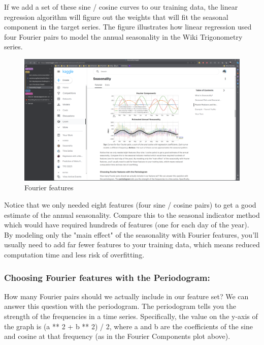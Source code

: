 \documentclass[12pt]{report}
\begin{document}
If we add a set of these sine / cosine curves to our training data, the linear regression algorithm will figure out the weights that will fit the seasonal component in the target series. The figure illustrates how linear regression used four Fourier pairs to model the annual seasonality in the Wiki Trigonometry series.

\begin{figure}[htbp]
  \begin{center}
    \includegraphics[trim =30cm 10.0cm 20cm 11cm, clip, scale=0.4]{pics/curves.png}
    \caption{Fourier features}
  \end{center}
\end{figure}

Notice that we only needed eight features (four sine / cosine pairs) to get a good estimate of the annual seasonality. Compare this to the seasonal indicator method which would have required hundreds of features (one for each day of the year). By modeling only the "main effect" of the seasonality with Fourier features, you'll usually need to add far fewer features to your training data, which means reduced computation time and less risk of overfitting.

\subsubsection{Choosing Fourier features with the Periodogram:}

How many Fourier pairs should we actually include in our feature set? We can answer this question with the periodogram. The periodogram tells you the strength of the frequencies in a time series. Specifically, the value on the y-axis of the graph is (a ** 2 + b ** 2) / 2, where a and b are the coefficients of the sine and cosine at that frequency (as in the Fourier Components plot above).
\end{document}
